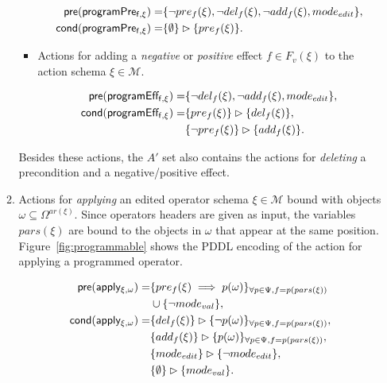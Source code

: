 \documentclass[letterpaper]{article} %
\newcommand{\pre}{\mathsf{pre}}     %
\newcommand{\cond}{\mathsf{cond}}   %
\begin{document}
\begin{itemize}
\begin{enumerate}
\begin{itemize}
\begin{small}
\begin{align*}
\hspace*{7pt}\pre(\mathsf{programPre_{f,\xi}})=&\{\neg pre_{f}(\xi), \neg del_{f}(\xi),\neg add_{f}(\xi), mode_{edit}\},\\
\cond(\mathsf{programPre_{f,\xi}})=&\{\emptyset\}\rhd\{pre_{f}(\xi)\}.
\end{align*}
\end{small}

\item Actions for adding a {\em negative} or {\em positive} effect $f\in F_v(\xi)$ to the action schema $\xi\in\mathcal{M}$.

\begin{small}
\begin{align*}
\hspace*{7pt}\pre(\mathsf{programEff_{f,\xi}})=&\{\neg del_{f}(\xi),\neg add_{f}(\xi), mode_{edit}\},\\
\cond(\mathsf{programEff_{f,\xi}})=&\{pre_{f}(\xi)\}\rhd\{del_{f}(\xi)\},\\
&\{\neg pre_{f}(\xi)\}\rhd\{add_{f}(\xi)\}.
\end{align*}
\end{small}
\end{itemize}
Besides these actions, the $A'$ set also contains the actions for {\em deleting} a precondition and a negative/positive effect.


\item Actions for {\em applying} an edited operator schema $\xi\in\mathcal{M}$ bound with objects $\omega\subseteq\Omega^{ar(\xi)}$. Since operators headers are given as input, the variables $pars(\xi)$ are bound to the objects in $\omega$ that appear at the same position. Figure~\ref{fig:programmable} shows the PDDL encoding of the action for applying a programmed operator.
\begin{small}
\begin{align*}
\hspace*{7pt}\pre(\mathsf{apply_{\xi,\omega}})=&\{pre_{f}(\xi)\implies p(\omega)\}_{\forall p\in\Psi,f=p(pars(\xi))}\\
&\cup \{\neg mode_{val}\},\\
\cond(\mathsf{apply_{\xi,\omega}})=&\{del_{f}(\xi)\}\rhd\{\neg p(\omega)\}_{\forall p\in\Psi,f=p(pars(\xi))},\\
&\{add_{f}(\xi)\}\rhd\{p(\omega)\}_{\forall p\in\Psi,f=p(pars(\xi))},\\
&\{mode_{edit}\}\rhd\{\neg mode_{edit}\},\\
&\{\emptyset\}\rhd\{mode_{val}\}.
\end{align*}
\end{small}


\end{enumerate}
\end{itemize}
\end{document}
